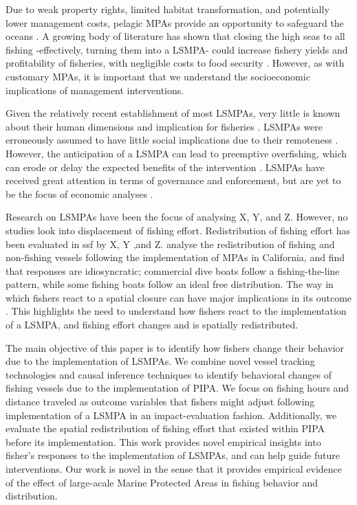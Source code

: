 \documentclass[11pt,]{article}
\begin{document}
Due to weak property rights, limited habitat transformation, and
potentially lower management costs, pelagic MPAs provide an opportunity
to safeguard the oceans \citet{game_2009}. A growing body of literature
has shown that closing the high seas to all fishing -effectively,
turning them into a LSMPA- could increase fishery yields and
profitability of fisheries, with negligible costs to food security
\citep{white_2014,sumaila_2015,sala_2018a,schiller_2018}. However, as
with customary MPAs, it is important that we understand the
socioeconomic implications of management interventions.

Given the relatively recent establishment of most LSMPAs, very little is
known about their human dimensions and implication for fisheries
\citep{gray_2017}. LSMPAs were erroneously assumed to have little social
implications due to their remoteness \citep{agardy_2011,gray_2017}.
However, the anticipation of a LSMPA can lead to preemptive overfishing,
which can erode or delay the expected benefits of the intervention
\citep{mcdermott_2018}. LSMPAs have received great attention in terms of
governance and enforcement, but are yet to be the focus of economic
analyses \citep{gray_2017}.

Research on LSMPAs have been the focus of analysing X, Y, and Z.
However, no studies look into displacement of fishing effort.
Redistribution of fishing effort has been evaluated in ssf by X, Y ,and
Z. \citet{cabral_2017} analyse the redistribution of fishing and
non-fishing vessels following the implementation of MPAs in California,
and find that responses are idiosyncratic; commercial dive boats follow
a fishing-the-line pattern, while some fishing boats follow an ideal
free distribution. The way in which fishers react to a spatial closure
can have major implications in its outcome
\citep{smith_2003,hilborn_2006}. This highlights the need to understand
how fishers react to the implementation of a LSMPA, and fishing effort
changes and is spatially redistributed.

The main objective of this paper is to identify how fishers change their
behavior due to the implementation of LSMPAs. We combine novel vessel
tracking technologies and causal inference techniques to identify
behavioral changes of fishing vessels due to the implementation of PIPA.
We focus on fishing hours and distance traveled as outcome variables
that fishers might adjust following implementation of a LSMPA in an
impact-evaluation fashion. Additionally, we evaluate the spatial
redistribution of fishing effort that existed within PIPA before its
implementation. This work provides novel empirical insights into
fisher's responses to the implementation of LSMPAs, and can help guide
future interventions. Our work is novel in the sense that it provides
empirical evidence of the effect of large-acale Marine Protected Areas
in fishing behavior and distribution.
\end{document}
